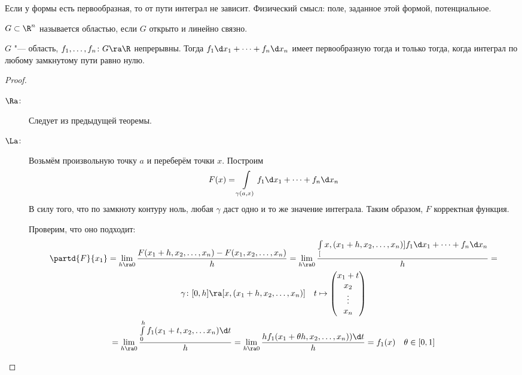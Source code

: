 \begin{conseq}
	Если у формы есть первообразная, то от пути интеграл не зависит.
	Физический смысл: поле, заданное этой формой, потенциальное.
\end{conseq}

\begin{Def}
	$G \subset \R^n$ называется областью, если $G$ открыто и линейно связно.
\end{Def}

\begin{theorem}
	$G$ "--- область, $f_1, \dots, f_n\colon G \ra \R$ непрерывны.
	Тогда $f_1 \d x_1 + \dots + f_n \d x_n$ имеет первообразную тогда и только тогда,
	когда интеграл по любому замкнутому пути равно нулю.
\end{theorem}
\begin{proof}
	\begin{description}
	\item[$\Ra$:]
		Следует из предыдущей теоремы.

	\item[$\La$:]
		Возьмём произвольную точку $a$ и переберём точки $x$.
		Построим
		\[ F(x) = \int\limits_{\gamma(a, x)} f_1 \d x_1 + \dots + f_n \d x_n \]
		В силу того, что по замкноту контуру ноль, любая $\gamma$ даст одно и то же значение интеграла.
		Таким образом, $F$ корректная функция.

		Проверим, что оно подходит:
		\begin{gather*}
			\partd{F}{x_1} = \lim_{h \ra 0} \frac{F(x_1 + h, x_2, \dots, x_n) - F(x_1, x_2, \dots, x_n)}h
			= \lim_{h \ra 0} \frac{\int\limits_[x, (x_1 + h, x_2, \dots, x_n)] f_1 \d x_1 + \dots + f_n \d x_n}h = \\
			\gamma\colon [0, h] \ra [x, (x_1 + h, x_2, \dots, x_n)] \quad t \mapsto \begin{pmatrix} x_1 + t\\x_2\\\vdots\\x_n\end{pmatrix} \\
			= \lim_{h \ra 0} \frac{\int\limits_0^h f_1(x_1+t, x_2, \dots x_n) \d t}h
			= \lim_{h \ra 0} \frac{h f_1(x_1 + \theta h, x_2, \dots, x_n)) \d t}h = f_1(x) \quad \theta \in [0, 1]
		\end{gather*}
	\end{description}
\end{proof}


